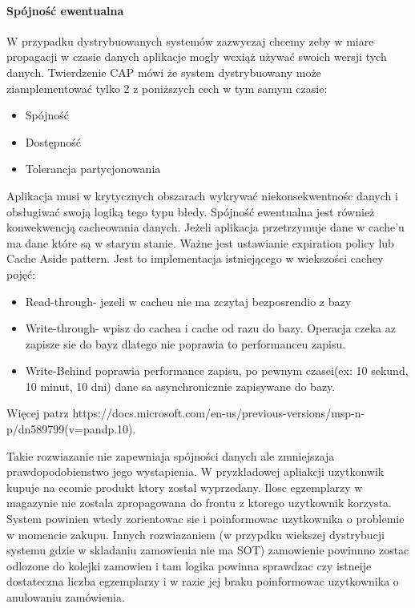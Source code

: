 \documentclass{article}
\begin{document}
\paragraph{Spójność ewentualna}
W przypadku dystrybuowanych systemów zazwyczaj chcemy zeby w miare propagacji w czasie danych aplikacje mogly wcxiąż używać swoich
wersji tych danych. Twierdzenie CAP mówi że system dystrybuowany może ziamplementować tylko 2 z poniższych cech w tym samym czasie:
\begin{itemize}
  \item Spójność
  \item Dostępność
  \item Tolerancja partycjonowania
\end{itemize}
Aplikacja musi w krytycznych obszarach wykrywać niekonsekwentnośc danych i obsługiwać swoją logiką tego typu błedy.
Spójność ewentualna jest również konwekwencją cacheowania danych. Jeżeli aplikacja przetrzymuje dane w cache'u ma dane które są w starym stanie.
Ważne jest ustawianie expiration policy lub Cache Aside pattern. Jest to implementacja istniejącego w wiekszości cachey pojęć:
\begin{itemize}
  \item Read-through- jezeli w cacheu nie ma zczytaj bezposrendio z bazy
  \item Write-through- wpisz do cachea i cache od razu do bazy. Operacja czeka az zapisze sie do bayz dlatego nie poprawia to performanceu zapisu.
  \item Write-Behind poprawia performance zapisu, po pewnym czasei(ex: 10 sekund, 10 minut, 10 dni) dane sa asynchronicznie zapisywane do bazy.
\end{itemize}
Więcej patrz https://docs.microsoft.com/en-us/previous-versions/msp-n-p/dn589799(v=pandp.10).

Takie rozwiazanie nie zapewniaja spójności danych ale zmniejszaja prawdopodobienstwo jego wystapienia.
W pryzkladowej apliakcji uzytkonwik kupuje na ecomie produkt ktory zostal wyprzedany. Ilosc egzemplarzy w magazynie nie zostala
zpropagowana do frontu z ktorego uzytkownik korzysta. System powinien wtedy zorientowac sie i poinformowac uzytkownika o problemie
w momencie zakupu. Innych rozwiazaniem (w przypdku wiekszej dystrybucji systemu gdzie w skladaniu zamowienia nie ma SOT) zamowienie
powinnno zostac odlozone do kolejki zamowien i tam logika powinna sprawdzac czy istneije dostateczna liczba egzemplarzy i w razie jej
braku poinformowac uzytkownika o anulowaniu zamówienia.
\end{document}
